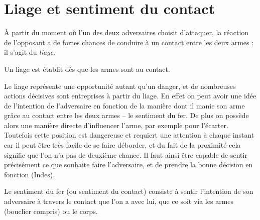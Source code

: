\section{Liage et sentiment du contact}


À partir du moment où l'un des deux adversaires choisit d'attaquer, la réaction de l'opposant a de fortes chances de conduire à un contact entre les deux armes : il s'agit du \emph{liage}.


\begin{definition}[Liage]
\label{conc:def:liage}

Un liage est établit dès que les armes sont au contact.
\end{definition}


Le liage représente une opportunité autant qu'un danger, et de nombreuses actions décisives sont entreprises à partir du liage.
En effet on peut avoir une idée de l'intention de l'adversaire en fonction de la manière dont il manie son arme grâce au contact entre les deux armes -- le sentiment du fer.
De plus on possède alors une manière directe d'influencer l'arme, par exemple pour l'écarter.
Toutefois cette position est dangereuse et requiert une attention à chaque instant car il peut être très facile de se faire déborder, et du fait de la proximité cela signifie que l'on n'a pas de deuxième chance.
Il faut ainsi être capable de sentir précisément ce que souhaite faire l'adversaire, et de prendre la bonne décision en fonction (Indes).


\begin{definition}
\label{conc:def:sentiment-fer}

Le sentiment du fer (ou sentiment du contact) consiste à sentir l'intention de son adversaire à travers le contact que l'on a avec lui, que ce soit via les armes (bouclier compris) ou le corps.
\end{definition}


